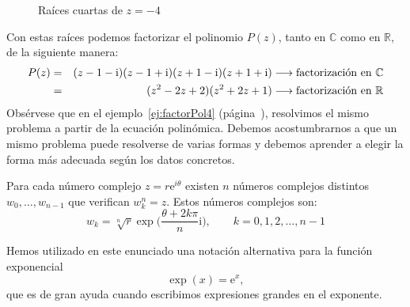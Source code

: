 \begin{ejemplo}
\begin{figure}[htb]
\begin{center}
\end{center}
\vspace{-2em}
\caption{Raíces cuartas de $z=-4$}\label{fig:raices4-1}
\end{figure}

Con estas raíces podemos factorizar el polinomio $P(z)$, tanto en $\mathbb{C}$ como en $\mathbb{R}$, de la siguiente manera:
\begin{eqnarray*}
P(z) &=& (z-1-\mathrm{i})(z-1+\mathrm{i})(z+1-\mathrm{i})(z+1+\mathrm{i})  \longrightarrow\mbox{factorización en $\mathbb{C}$}
\\ 
&=& (z^2-2z+2)(z^2+2z+1)  \hfill\longrightarrow\mbox{factorización en $\mathbb{R}$}
\end{eqnarray*}
Obsérvese que en el ejemplo~\ref{ej:factorPol4} (página~\pageref{ej:factorPol4}), resolvimos el mismo problema a partir de la ecuación polinómica. Debemos acostumbrarnos a que un mismo problema puede resolverse de varias formas y debemos aprender a elegir la forma más adecuada según los datos concretos.\fej
\end{ejemplo}
%
\begin{teorema}
Para cada número complejo $z=r\mathrm{e}^{i\theta}$ existen $n$ números complejos distintos $w_0,\dots,w_{n-1}$ que verifican $w_k^n=z$.
Estos números complejos son:
\[
w_k=\sqrt[n]{r}\exp\Big(\frac{\theta+2k\pi}{n} \mathrm{i} \Big),\qquad k=0,1,2,\dots,n-1
\]
\end{teorema}
Hemos utilizado en este enunciado una notación alternativa para la función exponencial
\[
\exp(x)=\mathrm{e}^x,
\]
que es de gran ayuda cuando escribimos expresiones grandes en el exponente.

